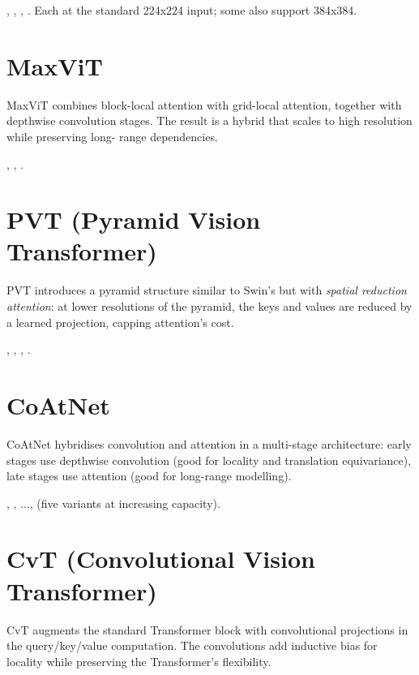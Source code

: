 , , ,
. Each at the standard 224x224 input; some
also support 384x384.

\section{MaxViT}
\label{sec:vision_transformers:maxvit}

MaxViT combines block-local attention with grid-local attention,
together with depthwise convolution stages. The result is a
hybrid that scales to high resolution while preserving long-
range dependencies.

, , .

\section{PVT (Pyramid Vision Transformer)}
\label{sec:vision_transformers:pvt}

PVT introduces a pyramid structure similar to Swin's but with
\emph{spatial reduction attention}: at lower resolutions of the
pyramid, the keys and values are reduced by a learned
projection, capping attention's cost.

, , ,
.

\section{CoAtNet}
\label{sec:vision_transformers:coatnet}

CoAtNet hybridises convolution and attention in a multi-stage
architecture: early stages use depthwise convolution (good for
locality and translation equivariance), late stages use
attention (good for long-range modelling).

, , ..., 
(five variants at increasing capacity).

\section{CvT (Convolutional Vision Transformer)}
\label{sec:vision_transformers:cvt}

CvT augments the standard Transformer block with convolutional
projections in the query/key/value computation. The convolutions
add inductive bias for locality while preserving the
Transformer's flexibility.

